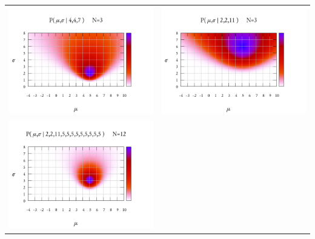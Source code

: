 \begin{tabular}{ll}
	\includegraphics{bayes3.png}&
	\includegraphics{bayes4.png}\\
	\includegraphics{bayes5.png}&

\end{tabular}

